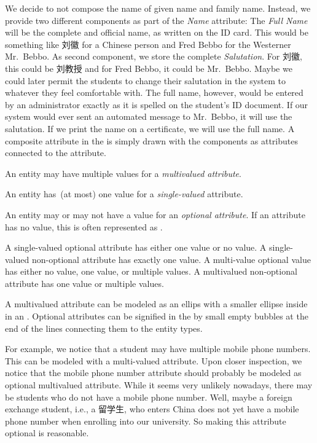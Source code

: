 We decide to not compose the name of given name and family name.
Instead, we provide two different components as part of the \emph{Name} attribute:
The \emph{Full Name} will be the complete and official name, as written on the ID card.
This would be something like 刘徽 for a Chinese person and Fred Bebbo for the Westerner Mr.~Bebbo.
As second component, we store the complete \emph{Salutation}.
For 刘徽, this could be 刘教授 and for Fred Bebbo, it could be Mr.~Bebbo.
Maybe we could later permit the students to change their salutation in the system to whatever they feel comfortable with.
The full name, however, would be entered by an administrator exactly as it is spelled on the student's ID document.
If our system would ever sent an automated message to Mr.~Bebbo, it will use the salutation.
If we print the name on a certificate, we will use the full name.
A composite attribute in the  is simply drawn with the components as attributes connected to the attribute.%
%
\begin{definition}%
An entity may have multiple values for a \emph{multivalued attribute}.%
\end{definition}%
\begin{definition}%
An entity has~(at most) one value for a \emph{single-valued} attribute.%
\end{definition}%
\begin{definition}%
An entity may or may not have a value for an \emph{optional attribute}. %
If an attribute has no value, this is often represented as .%
\end{definition}%
%
A single-valued optional attribute has either one value or no value.
A single-valued non-optional attribute has exactly one value.
A multi-value optional value has either no value, one value, or multiple values.
A multivalued non-optional attribute has one value or multiple values.

A multivalued attribute can be modeled as an ellips with a smaller ellipse inside in an .
Optional attributes can be signified in the  by small empty bubbles at the end of the lines connecting them to the entity types.

For example, we notice that a student may have multiple mobile phone numbers.
This can be modeled with a multi-valued attribute.
Upon closer inspection, we notice that the mobile phone number attribute should probably be modeled as optional multivalued attribute.
While it seems very unlikely nowadays, there may be students who do not have a mobile phone number.
Well, maybe a foreign exchange student, i.e., a 留学生, who enters China does not yet have a mobile phone number when enrolling into our university.
So making this attribute optional is reasonable.


